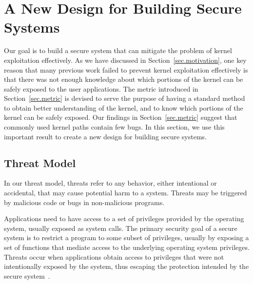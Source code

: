 \section{A New Design for Building Secure Systems}
\label{sec.design}



Our goal is to build a secure system that can mitigate the problem of kernel exploitation effectively. 
As we have discussed in Section~\ref{sec.motivation}, one key reason that many previous work 
failed to prevent kernel exploitation effectively is that there was not enough knowledge about 
which portions of the kernel can be safely exposed to the user applications. 
The metric introduced in Section~\ref{sec.metric} is devised to serve the purpose of having a standard method to 
obtain better understanding of the kernel, and to know which portions of the kernel can be safely exposed. 
Our findings in Section~\ref{sec.metric} suggest that commonly used kernel paths contain few bugs.
In this section, we use this important result to create a new design for building secure systems. 

\subsection{Threat Model}
In our threat model, threats refer to any behavior, either intentional or accidental, that may cause potential harm 
to a system. Threats may be triggered by malicious code or bugs in non-malicious programs.

Applications need to have access to a set of privileges provided by 
the operating system, usually exposed as system calls. The primary security goal of a secure system is to 
restrict a program to some subset of privileges, usually by exposing a set of functions that mediate 
access to the underlying operating system privileges. Threats occur when applications obtain access to 
privileges that were not intentionally exposed by the system, thus escaping the protection 
intended by the secure system~\cite{Repy:10}.


